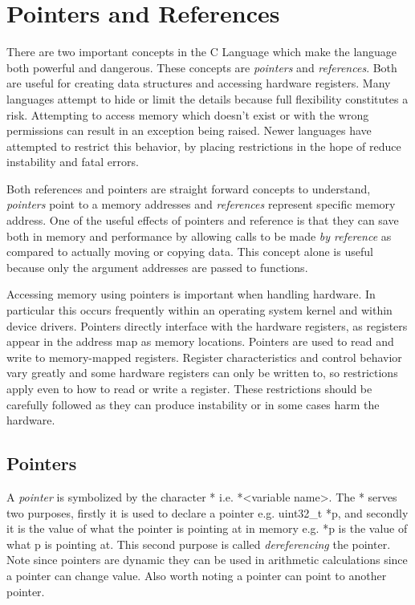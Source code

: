 \section{Pointers and References} \label{Pointers}


There are two important concepts in the C Language which make the language both powerful and dangerous. These concepts are \textit{pointers} and \textit{references}. Both are useful for creating data structures and accessing hardware registers. Many languages attempt to hide or limit the details because full flexibility constitutes a risk. Attempting to access memory which doesn't exist or with the wrong permissions can result in an exception being raised. Newer languages have attempted to restrict this behavior, by placing restrictions in the hope of reduce instability and fatal errors. 

Both references and pointers are straight forward concepts to understand, \textit{pointers} point to a memory addresses and \textit{references} represent specific memory address. One of the useful effects of pointers and reference is that they can save both in memory and performance by allowing calls to be made \textit{by reference} as compared to actually moving or copying data. This concept alone is useful because only the argument addresses are passed to functions.

Accessing memory using pointers is important when handling hardware. In particular this occurs frequently within an operating system kernel and within device drivers. Pointers directly interface with the hardware registers, as registers appear in the address map as memory locations. Pointers are used to read and write to memory-mapped registers. Register characteristics and control behavior vary greatly and some hardware registers can only be written to, so restrictions apply even to how to read or write a register. These restrictions should be carefully followed as they can produce instability or in some cases harm the hardware. 


\subsection{Pointers}


A \textit{pointer} is symbolized by the character * i.e. *\textless{variable name}\textgreater. 
The * serves two purposes, firstly it is used to declare a pointer e.g. uint32\_t *p, and secondly it is the value of what the pointer is pointing at in memory e.g. *p is the value of what p is pointing at. This second purpose is called \textit{dereferencing} the pointer. Note since pointers are dynamic they can be used in arithmetic calculations since a pointer can change value. Also worth noting a pointer can point to another pointer.

